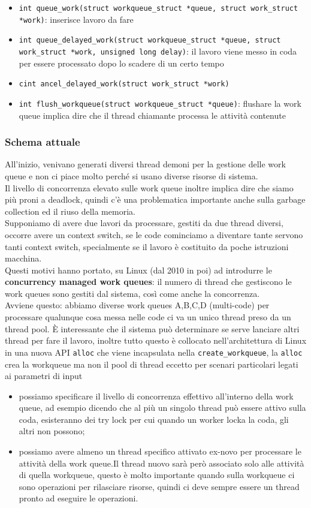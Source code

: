 \documentclass[12pt, oneside]{extbook}
\begin{document}
\begin{itemize}
\item \texttt{int queue\_work(struct workqueue\_struct *queue, struct work\_struct *work)}: inserisce lavoro da fare
\item \texttt{int queue\_delayed\_work(struct workqueue\_struct *queue, struct work\_struct *work, unsigned long delay)}: il lavoro viene messo in coda per essere processato dopo lo scadere di un certo tempo
\item \texttt{cint ancel\_delayed\_work(struct work\_struct *work)}
\item \texttt{int flush\_workqueue(struct workqueue\_struct *queue)}: flushare la work queue implica dire che il thread chiamante processa le attività contenute
\end{itemize}
\subsubsection{Schema attuale}
All'inizio, venivano generati diversi thread demoni per la gestione delle work queue e non ci piace molto perché si usano diverse risorse di sistema.\\Il livello di concorrenza elevato sulle work queue inoltre implica dire che siamo più proni a deadlock, quindi c'è una problematica importante anche sulla garbage collection ed il riuso della memoria.\\Supponiamo di avere due lavori da processare, gestiti da due thread diversi, occorre avere un context switch, se le code cominciamo a diventare tante servono tanti context switch, specialmente se il lavoro è costituito da poche istruzioni macchina.\\Questi motivi hanno portato, su Linux (dal 2010 in poi) ad introdurre le \textbf{concurrency managed work queues}: il numero di thread che gestiscono le work queues sono gestiti dal sistema, così come anche la concorrenza.\\Avviene questo: abbiamo diverse work queues A,B,C,D (multi-code) per processare qualunque cosa messa nelle code ci va un unico thread preso da un thread pool. È interessante che il sistema può determinare se serve lanciare altri thread per fare il lavoro, inoltre tutto questo è collocato nell'architettura di Linux in una nuova API \texttt{alloc} che viene incapsulata nella \texttt{create\_workqueue}, la \texttt{alloc} crea la workqueue ma non il pool di thread eccetto per scenari particolari legati ai parametri di input
\begin{itemize}
\item possiamo specificare il livello di concorrenza effettivo all'interno della work queue, ad esempio dicendo che al più un singolo thread può essere attivo sulla coda, esisteranno dei try lock per cui quando un worker locka la coda, gli altri non possono;
\item possiamo avere almeno un thread specifico attivato ex-novo per processare le attività della work queue.Il thread nuovo sarà però associato solo alle attività di quella workqueue, questo è molto importante quando sulla workqueue ci sono operazioni per rilasciare risorse, quindi ci deve sempre essere un thread pronto ad eseguire le operazioni.
\end{itemize}
\end{document}
